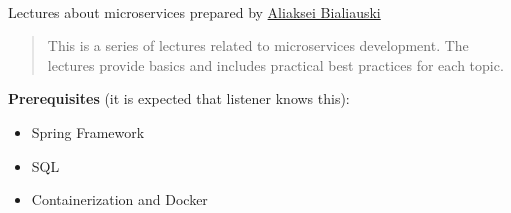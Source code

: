 \documentclass[nobrand,anonymous,nodate,nosecurity]{../solvd}
\begin{document}
{
    \\
    Lectures about microservices prepared by \href{https://h1alexbel.github.io/about-me.html}{Aliaksei Bialiauski}

    \begin{abstract}
        This is a series of lectures related to microservices development.
        The lectures provide basics and includes practical best practices for each topic.
    \end{abstract}

    \textbf{Prerequisites} (it is expected that listener knows this):
    \begin{itemize}
        \item Spring Framework
        \item SQL
        \item Containerization and Docker
    \end{itemize}

}
\end{document}
